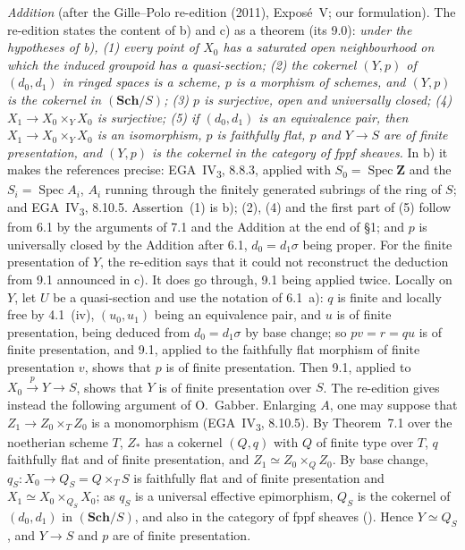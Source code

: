\par\medskip\noindent
\emph{Addition} (after the Gille--Polo re-edition (2011), Exposé~V; our
formulation). The re-edition states the content of b) and c) as a theorem
(its 9.0): \emph{under the hypotheses of b), (1) every point of \(X_0\) has a
saturated open neighbourhood on which the induced groupoid has a
quasi-section; (2) the cokernel \((Y,p)\) of \((d_0,d_1)\) in ringed spaces is
a scheme, \(p\) is a morphism of schemes, and \((Y,p)\) is the cokernel in
\((\mathbf{Sch}/S)\); (3) \(p\) is surjective, open and universally closed;
(4) \(X_1\to X_0\times_YX_0\) is surjective; (5) if \((d_0,d_1)\) is an
equivalence pair, then \(X_1\to X_0\times_YX_0\) is an isomorphism, \(p\) is
faithfully flat, \(p\) and \(Y\to S\) are of finite presentation, and \((Y,p)\)
is the cokernel in the category of fppf sheaves.} In b) it makes the
references precise: EGA~IV\textsubscript{3}, 8.8.3, applied with
\(S_0=\operatorname{Spec}\mathbf Z\) and the \(S_i=\operatorname{Spec}A_i\), \(A_i\)
running through the finitely generated subrings of the ring of \(S\); and
EGA~IV\textsubscript{3}, 8.10.5. Assertion~(1) is b); (2), (4) and the first part of
(5) follow from 6.1 by the arguments of 7.1 and the Addition at the end of
\S1; and \(p\) is universally closed by the Addition after 6.1, \(d_0=d_1\sigma\)
being proper. For the finite presentation of \(Y\), the re-edition says that
it could not reconstruct the deduction from 9.1 announced in c). It does
go through, 9.1 being applied twice. Locally on \(Y\), let \(U\) be a
quasi-section and use the notation of 6.1~a): \(q\) is finite and locally
free by 4.1~(iv), \((u_0,u_1)\) being an equivalence pair, and \(u\) is of
finite presentation, being deduced from \(d_0=d_1\sigma\) by base change; so
\(pv=r=qu\) is of finite presentation, and 9.1, applied to the faithfully flat
morphism of finite presentation \(v\), shows that \(p\) is of finite
presentation. Then 9.1, applied to \(X_0\xrightarrow{p}Y\to S\), shows that \(Y\)
is of finite presentation over \(S\). The re-edition gives instead the
following argument of O.~Gabber. Enlarging \(A\), one may suppose that
\(Z_1\to Z_0\times_TZ_0\) is a monomorphism (EGA~IV\textsubscript{3}, 8.10.5). By
Theorem~7.1 over the noetherian scheme \(T\), \(Z_\ast\) has a cokernel \((Q,q)\)
with \(Q\) of finite type over \(T\), \(q\) faithfully flat and of finite
presentation, and \(Z_1\simeq Z_0\times_QZ_0\). By base change,
\(q_S\colon X_0\to Q_S=Q\times_TS\) is faithfully flat and of finite
presentation and \(X_1\simeq X_0\times_{Q_S}X_0\); as \(q_S\) is a universal
effective epimorphism, \(Q_S\) is the cokernel of \((d_0,d_1)\) in
\((\mathbf{Sch}/S)\), and also in the category of fppf sheaves
(). Hence \(Y\simeq Q_S\), and \(Y\to S\) and \(p\) are of finite
presentation.
\par\medskip

